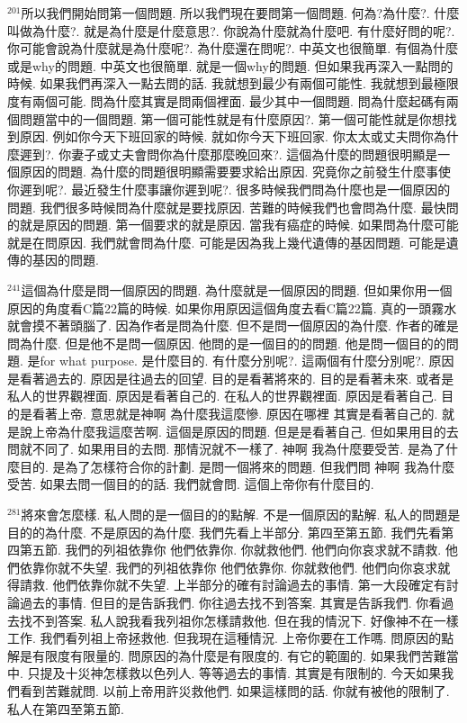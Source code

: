 \documentclass{book}
\begin{document}
$^{201}$所以我們開始問第一個問題.
所以我們現在要問第一個問題.
何為?為什麼?.
什麼叫做為什麼?.
就是為什麼是什麼意思?.
你說為什麼就為什麼吧.
有什麼好問的呢?.
你可能會說為什麼就是為什麼呢?.
為什麼還在問呢?.
中英文也很簡單.
有個為什麼或是why的問題.
中英文也很簡單.
就是一個why的問題.
但如果我再深入一點問的時候.
如果我們再深入一點去問的話.
我就想到最少有兩個可能性.
我就想到最極限度有兩個可能.
問為什麼其實是問兩個裡面.
最少其中一個問題.
問為什麼起碼有兩個問題當中的一個問題.
第一個可能性就是有什麼原因?.
第一個可能性就是你想找到原因.
例如你今天下班回家的時候.
就如你今天下班回家.
你太太或丈夫問你為什麼遲到?.
你妻子或丈夫會問你為什麼那麼晚回來?.
這個為什麼的問題很明顯是一個原因的問題.
為什麼的問題很明顯需要要求給出原因.
究竟你之前發生什麼事使你遲到呢?.
最近發生什麼事讓你遲到呢?.
很多時候我們問為什麼也是一個原因的問題.
我們很多時候問為什麼就是要找原因.
苦難的時候我們也會問為什麼.
最快問的就是原因的問題.
第一個要求的就是原因.
當我有癌症的時候.
如果問為什麼可能就是在問原因.
我們就會問為什麼.
可能是因為我上幾代遺傳的基因問題.
可能是遺傳的基因的問題.

$^{241}$這個為什麼是問一個原因的問題.
為什麼就是一個原因的問題.
但如果你用一個原因的角度看C篇22篇的時候.
如果你用原因這個角度去看C篇22篇.
真的一頭霧水 就會摸不著頭腦了.
因為作者是問為什麼.
但不是問一個原因的為什麼.
作者的確是問為什麼.
但是他不是問一個原因.
他問的是一個目的的問題.
他是問一個目的的問題.
是for what purpose.
是什麼目的.
有什麼分別呢?.
這兩個有什麼分別呢?.
原因是看著過去的.
原因是往過去的回望.
目的是看著將來的.
目的是看著未來.
或者是私人的世界觀裡面.
原因是看著自己的.
在私人的世界觀裡面.
原因是看著自己.
目的是看著上帝.
意思就是神啊 為什麼我這麼慘.
原因在哪裡 其實是看著自己的.
就是說上帝為什麼我這麼苦啊.
這個是原因的問題.
但是是看著自己.
但如果用目的去問就不同了.
如果用目的去問.
那情況就不一樣了.
神啊 我為什麼要受苦.
是為了什麼目的.
是為了怎樣符合你的計劃.
是問一個將來的問題.
但我們問 神啊 我為什麼受苦.
如果去問一個目的的話.
我們就會問.
這個上帝你有什麼目的.

$^{281}$將來會怎麼樣.
私人問的是一個目的的點解.
不是一個原因的點解.
私人的問題是目的的為什麼.
不是原因的為什麼.
我們先看上半部分.
第四至第五節.
我們先看第四第五節.
我們的列祖依靠你 他們依靠你.
你就救他們.
他們向你哀求就不請救.
他們依靠你就不失望.
我們的列祖依靠你 他們依靠你.
你就救他們.
他們向你哀求就得請救.
他們依靠你就不失望.
上半部分的確有討論過去的事情.
第一大段確定有討論過去的事情.
但目的是告訴我們.
你往過去找不到答案.
其實是告訴我們.
你看過去找不到答案.
私人說我看我列祖你怎樣請救他.
但在我的情況下.
好像神不在一樣工作.
我們看列祖上帝拯救他.
但我現在這種情況.
上帝你要在工作嗎.
問原因的點解是有限度有限量的.
問原因的為什麼是有限度的.
有它的範圍的.
如果我們苦難當中.
只提及十災神怎樣救以色列人.
等等過去的事情.
其實是有限制的.
今天如果我們看到苦難就問.
以前上帝用許災救他們.
如果這樣問的話.
你就有被他的限制了.
私人在第四至第五節.
\end{document}
